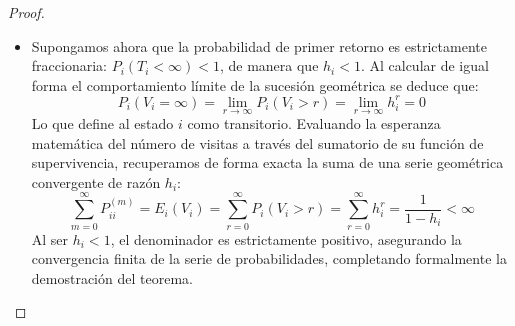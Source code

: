 \begin{teo}
\begin{proof}
\begin{itemize}
        \item[\textbf{Caso ii)}] Supongamos ahora que la probabilidad de primer retorno es estrictamente fraccionaria: $P_i(T_i < \infty) < 1$, de manera que $h_i < 1$. Al calcular de igual forma el comportamiento límite de la sucesión geométrica se deduce que:
        \[ 
        P_i(V_i = \infty) = \lim_{r \to \infty} P_i(V_i > r) = \lim_{r \to \infty} h_i^r = 0 
        \]
        Lo que define al estado $i$ como transitorio. Evaluando la esperanza matemática del número de visitas a través del sumatorio de su función de supervivencia, recuperamos de forma exacta la suma de una serie geométrica convergente de razón $h_i$:
        \[ 
        \sum_{m=0}^{\infty} P_{ii}^{(m)} = E_i(V_i) = \sum_{r=0}^{\infty} P_i(V_i > r) = \sum_{r=0}^{\infty} h_i^r = \frac{1}{1 - h_i} < \infty 
        \]
        Al ser $h_i < 1$, el denominador es estrictamente positivo, asegurando la convergencia finita de la serie de probabilidades, completando formalmente la demostración del teorema.
    \end{itemize}
\end{proof}
\end{teo}


